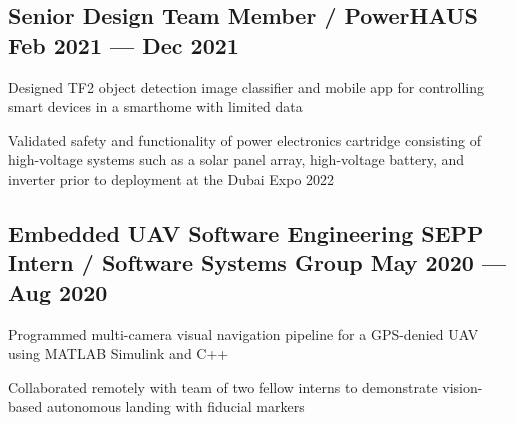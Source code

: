 \subsection{{Senior Design Team Member / PowerHAUS \hfill Feb 2021 --- Dec 2021}}
\begin{zitemize}
	\item Designed TF2 object detection image classifier and mobile app for controlling smart devices in a smarthome
	with limited data
	\item Validated safety and functionality of power electronics cartridge consisting of high-voltage systems such as a
	solar panel array, high-voltage battery, and inverter prior to deployment at the Dubai Expo 2022
\end{zitemize}


\subsection{{Embedded UAV Software Engineering SEPP Intern / Software Systems Group  \hfill May 2020 --- Aug 2020}}
\begin{zitemize}
	\item Programmed multi-camera visual navigation pipeline for a GPS-denied UAV using MATLAB Simulink and C++
	\item Collaborated remotely with team of two fellow interns to demonstrate vision-based autonomous landing with fiducial
	markers
\end{zitemize}

